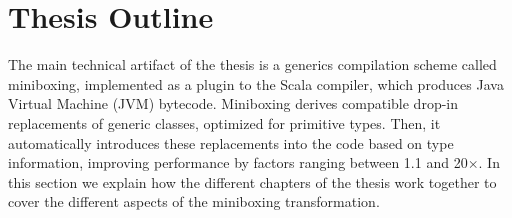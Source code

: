 
%
%
%

\section{Thesis Outline}

The main technical artifact of the thesis is a generics compilation scheme called miniboxing, implemented as a plugin to the Scala compiler, which produces Java Virtual Machine (JVM) bytecode. Miniboxing derives compatible drop-in replacements of generic classes, optimized for primitive types. Then, it automatically introduces these replacements into the code based on type information, improving performance by factors ranging between 1.1 and 20$\times$. In this section we explain how the different chapters of the thesis work together to cover the different aspects of the miniboxing transformation.


